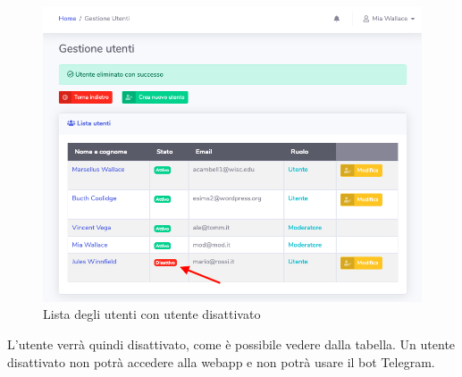 		\begin{figure}[H]
		\centering
		\includegraphics[scale=0.600]{res/images/mod/utenteDisatt.png}
		\caption{Lista degli utenti con utente disattivato}
	\end{figure}
		L'utente verrà quindi disattivato, come è possibile vedere dalla tabella. Un utente disattivato non potrà accedere alla webapp e non potrà usare il bot Telegram.

